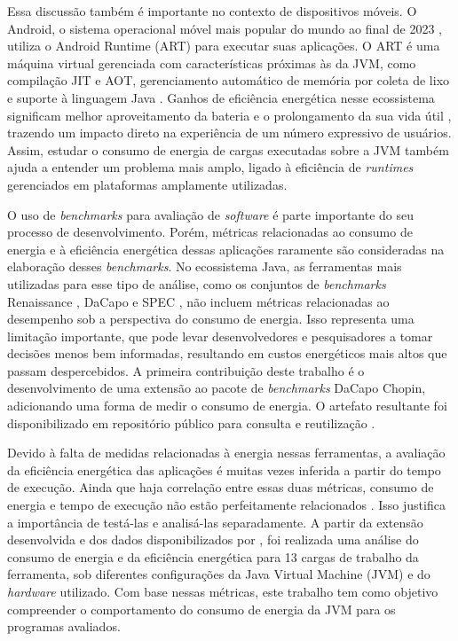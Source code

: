 Essa discussão também é importante no contexto de dispositivos móveis. O
Android, o sistema operacional móvel mais popular do mundo ao final de 2023
\cite{art-memory-management}, utiliza o Android Runtime (ART) para executar suas aplicações. 
O ART é uma máquina virtual gerenciada com características próximas às da JVM, como compilação JIT e AOT,
gerenciamento automático de memória por coleta de lixo e suporte à linguagem
Java \cite{art-memory-management}. Ganhos de eficiência energética nesse ecossistema
significam melhor aproveitamento da bateria e o prolongamento da sua vida útil \cite{dalvik-vs-art}, 
trazendo um impacto direto na experiência de um número expressivo de usuários. 
Assim, estudar o consumo de energia de cargas
executadas sobre a JVM também ajuda a entender um problema mais amplo, ligado
à eficiência de \textit{runtimes} gerenciados em plataformas amplamente
utilizadas.

O uso de \textit{benchmarks} para avaliação de \textit{software} é parte
importante do seu processo de desenvolvimento. Porém, métricas relacionadas ao
consumo de energia e à eficiência energética dessas aplicações raramente são
consideradas na elaboração desses \textit{benchmarks}. No ecossistema Java, as
ferramentas mais utilizadas para esse tipo de análise, como os conjuntos de
\textit{benchmarks} Renaissance \cite{renaissance}, DaCapo
\cite{dacapochopin} e SPEC \cite{spec}, não incluem métricas relacionadas ao
desempenho sob a perspectiva do consumo de energia. Isso representa uma
limitação importante, que pode levar desenvolvedores e pesquisadores a tomar
decisões menos bem informadas, resultando em custos energéticos mais altos que
passam despercebidos. A primeira contribuição deste trabalho é o
desenvolvimento de uma extensão ao pacote de \textit{benchmarks} DaCapo
Chopin, adicionando uma forma de medir o consumo de energia. O artefato
resultante foi disponibilizado em repositório público para consulta e reutilização
\cite{dacapo-energy-tool}.

Devido à falta de medidas relacionadas à energia nessas ferramentas, a
avaliação da eficiência energética das aplicações é muitas vezes inferida a
partir do tempo de execução. Ainda que haja correlação entre essas duas
métricas, consumo de energia e tempo de execução não estão perfeitamente
relacionados \cite{programming_lang_energy}. Isso justifica a importância de
testá-las e analisá-las separadamente. A partir da extensão desenvolvida e dos
dados disponibilizados por , foi realizada uma análise
do consumo de energia e da eficiência energética para 13 cargas de trabalho da
ferramenta, sob diferentes configurações da Java Virtual Machine (JVM) e do
\textit{hardware} utilizado. Com base nessas métricas, este trabalho tem como
objetivo compreender o comportamento do consumo de energia da JVM para os
programas avaliados.
